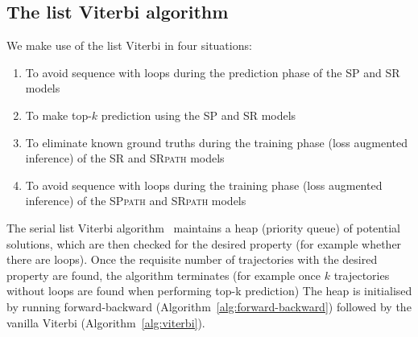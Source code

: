 \subsection{The list Viterbi algorithm}
\label{sec:listviterbi-supp}

We make use of the list Viterbi in four situations:
\begin{enumerate}
  \item To avoid sequence with loops during the prediction phase of the SP and SR models
  \item To make top-$k$ prediction using the SP and SR models
  \item To eliminate known ground truths during the training phase (\ie loss augmented inference) of the SR and \textsc{SRpath} models
  \item To avoid sequence with loops during the training phase (\ie loss augmented inference) of the \textsc{SPpath} and \textsc{SRpath} models
\end{enumerate}


The serial list Viterbi algorithm~\cite{nilsson2001sequentially,seshadri1994list} maintains
a heap (\ie priority queue) of potential solutions, which are then checked for the desired property (for example
whether there are loops). Once the requisite number of trajectories with the desired
property are found, the algorithm terminates (for example once $k$ trajectories without loops are found when performing top-k prediction)
The heap is initialised by running forward-backward (Algorithm~\ref{alg:forward-backward}) followed by the vanilla Viterbi (Algorithm~\ref{alg:viterbi}).

